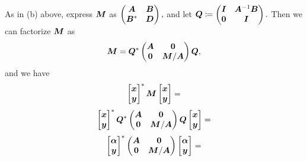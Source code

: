 \documentclass[twoside,10pt]{article}
\begin{document}
As in (b) above, express $\bm{M}$ as
$\begin{pmatrix}
  \bm{A} & \bm{B}\\
  \bm{B}^{*} & \bm{D}
\end{pmatrix},$ and let $\bm{Q} \coloneqq \begin{pmatrix}
  \bm{I} & \bm{A}^{-1} \bm{B} \\
  \bm{0} & \bm{I}
\end{pmatrix}.$ Then we can factorize $\bm{M}$ as
\begin{equation*}
  \bm{M} = 
  \bm{Q}^{*} 
  \begin{pmatrix}
    \bm{A} & \bm{0} \\
    \bm{0} & \bm{M} / \bm{A}
  \end{pmatrix}
  \bm{Q},
\end{equation*}
and we have
\begin{equation*}
  \begin{bmatrix}\bm{x}\\\bm{y}\end{bmatrix}^{*}\bm{M}\begin{bmatrix}\bm{x}\\\bm{y}\end{bmatrix} =
\end{equation*}
\begin{equation*}
 \begin{bmatrix}\bm{x}\\\bm{y}\end{bmatrix}^{*}
  \bm{Q}^{*} 
  \begin{pmatrix}
    \bm{A} & \bm{0} \\
    \bm{0} & \bm{M} / \bm{A}
  \end{pmatrix}
  \bm{Q}
 \begin{bmatrix}\bm{x}\\\bm{y}\end{bmatrix} =
\end{equation*}
\begin{equation*}
 \begin{bmatrix}\bm{\alpha}\\\bm{y}\end{bmatrix}^{*}
  \begin{pmatrix}
    \bm{A} & \bm{0} \\
    \bm{0} & \bm{M} / \bm{A}
  \end{pmatrix}
 \begin{bmatrix}\bm{\alpha}\\\bm{y}\end{bmatrix} =
\end{equation*}
\end{document}
